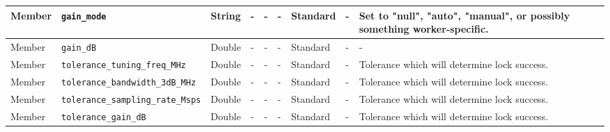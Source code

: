 \documentclass{article}
\begin{document}
\begin{landscape}
\begin{scriptsize}
\begin{longtable}{|p{1.8cm}|p{3.6cm}|c|c|c|p{2cm}|p{1.7cm}|p{1.0cm}|p{7.37cm}|}
			\hline
			Member       & \verb+gain_mode+                      & String & -       & -          & -              & Standard     & -       & Set to "null", "auto", "manual", or possibly something worker-specific. \\
			\hline
			Member       & \verb+gain_dB+                        & Double & -       & -          & -              & Standard     & -       & - \\
			\hline
			Member       & \verb+tolerance_tuning_freq_MHz+              & Double & -       & -          & -              & Standard     & -       & Tolerance which will determine lock success. \\
			\hline
			Member       & \verb+tolerance_bandwidth_3dB_MHz+              & Double & -       & -          & -              & Standard     & -       & Tolerance which will determine lock success. \\
			\hline
			Member       & \verb+tolerance_sampling_rate_Msps+             & Double & -       & -          & -              & Standard     & -       & Tolerance which will determine lock success. \\
			\hline
			Member       & \verb+tolerance_gain_dB+                        & Double & -       & -          & -              & Standard     & -       & Tolerance which will determine lock success. \\
			\hline
		\end{longtable}
	\end{scriptsize}


\end{landscape}
\end{document}
